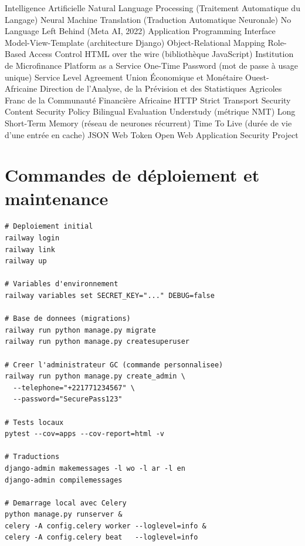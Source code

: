 \documentclass[12pt,a4paper,twoside]{report}
\begin{document}
\begin{acronym}[NLLB-200]
       {Intelligence Artificielle}
      {Natural Language Processing (Traitement Automatique du Langage)}
      {Neural Machine Translation (Traduction Automatique Neuronale)}
     {No Language Left Behind (Meta AI, 2022)}
      {Application Programming Interface}
      {Model-View-Template (architecture Django)}
      {Object-Relational Mapping}
     {Role-Based Access Control}
     {HTML over the wire (bibliothèque JavaScript)}
      {Institution de Microfinance}
     {Platform as a Service}
      {One-Time Password (mot de passe à usage unique)}
      {Service Level Agreement}
    {Union Économique et Monétaire Ouest-Africaine}
    {Direction de l'Analyse, de la Prévision et des Statistiques Agricoles}
     {Franc de la Communauté Financière Africaine}
     {HTTP Strict Transport Security}
      {Content Security Policy}
     {Bilingual Evaluation Understudy (métrique NMT)}
     {Long Short-Term Memory (réseau de neurones récurrent)}
      {Time To Live (durée de vie d'une entrée en cache)}
      {JSON Web Token}
    {Open Web Application Security Project}
\end{acronym}

\chapter{Commandes de déploiement et maintenance}
\label{ann:commandes}

\begin{lstlisting}[style=bashstyle, caption={Commandes Railway CLI et Django management}]
# Deploiement initial
railway login
railway link
railway up

# Variables d'environnement
railway variables set SECRET_KEY="..." DEBUG=false

# Base de donnees (migrations)
railway run python manage.py migrate
railway run python manage.py createsuperuser

# Creer l'administrateur GC (commande personnalisee)
railway run python manage.py create_admin \
  --telephone="+221771234567" \
  --password="SecurePass123"

# Tests locaux
pytest --cov=apps --cov-report=html -v

# Traductions
django-admin makemessages -l wo -l ar -l en
django-admin compilemessages

# Demarrage local avec Celery
python manage.py runserver &
celery -A config.celery worker --loglevel=info &
celery -A config.celery beat   --loglevel=info
\end{lstlisting}
\end{document}
